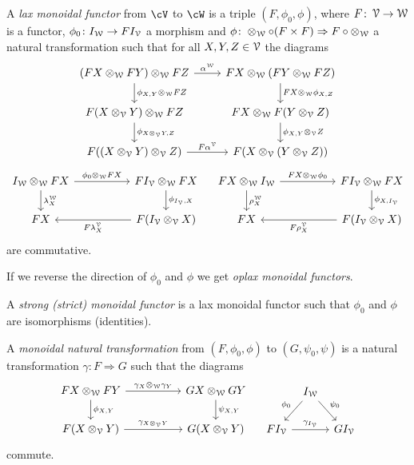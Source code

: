 \documentclass[a4paper,11pt,oneside,openany]{scrbook}
\begin{document}
\begin{defn}
	A \emph{lax monoidal functor} from $\cV$ to $\cW$ is a triple $(F,\phi_0,\phi)$, where $F\colon\operatorname{\mathcal{V}}\rightarrow\operatorname{\mathcal{W}}$ is a functor, $\phi_0\colon I_{\operatorname{\mathcal{W}}}\rightarrow FI_{\operatorname{\mathcal{V}}}$ a morphism and $\phi\colon\otimes_{\operatorname{\mathcal{W}}}\circ(F\times F)\Rightarrow F\circ\otimes_{\operatorname{\mathcal{W}}}$ a natural transformation such that for all $X,Y,Z\in\operatorname{\mathcal{V}}$ the diagrams
	\[
		\begin{tikzcd}
			(FX\otimes_{\W}FY)\otimes_{\W}FZ\ar[r, "\alpha^{\W}"]\ar[d, "\phi_{X,Y}\otimes_{\W}FZ"]
			& FX\otimes_{\W}(FY\otimes_{\W}FZ)\ar[d, "FX\otimes_{\W}\phi_{X,Z}"] \\
			F(X\otimes_{\V}Y)\otimes_{\W}FZ\ar[d, "\phi_{X\otimes_{\V}Y,Z}"]
			& FX\otimes_{\W}F(Y\otimes_{\V}Z)\ar[d, "\phi_{X,Y}\otimes_{\V}Z"] \\
			F((X\otimes_{\V}Y)\otimes_{\V}Z)\ar[r, "F\alpha^{\V}"]
			& F(X\otimes_{\V}(Y\otimes_{\V}Z))
		\end{tikzcd}
	\]
	\[
		\begin{tikzcd}[column sep=5.0em]
			I_{\W}\otimes_{\W}FX\ar[r, "\phi_0\otimes_{\W}FX"]\ar[d, "\lambda_X^{\W}"]
			& FI_{\V}\otimes_{\W}FX\ar[d, "\phi_{I_{\V},X}"] \\
			FX
			& F(I_{\V}\otimes_{\V}X)\ar[l, "F\lambda_X^{\V}"]
		\end{tikzcd}
		\quad
		\begin{tikzcd}[column sep=5.0em]
			FX\otimes_{\W}I_{\W}\ar[r, "FX\otimes_{\W}\phi_0"]\ar[d, "\rho_X^{\W}"]
			& FI_{\V}\otimes_{\W}FX\ar[d, "\phi_{X,I_{\V}}"] \\
			FX
			& F(I_{\V}\otimes_{\V}X)\ar[l, "F\rho_X^{\V}"]
		\end{tikzcd}
	\]
	are commutative.

	If we reverse the direction of $\phi_0$ and $\phi$ we get \emph{oplax monoidal functors}.

	A \emph{strong (strict) monoidal functor} is a lax monoidal functor such that $\phi_0$ and $\phi$ are isomorphisms (identities).

	A \emph{monoidal natural transformation} from $(F,\phi_0,\phi)$ to $(G,\psi_0,\psi)$ is a natural transformation $\gamma\colon F\Rightarrow G$ such that the diagrams
	\[
		\begin{tikzcd}[column sep=5.0em]
			FX\otimes_{\W}FY\ar[r, "\gamma_X\otimes_{\W}\gamma_Y"]\ar[d, "\phi_{X,Y}"]
			& GX\otimes_{\W}GY\ar[d, "\psi_{X,Y}"] \\
			F(X\otimes_{\V}Y)\ar[r, "\gamma_{X\otimes_{\V}Y}"]
			& G(X\otimes_{\V}Y)
		\end{tikzcd}
		\quad
		\begin{tikzcd}[column sep=tiny]
			& I_{\W}\ar[dl, "\phi_0", swap]\ar[dr, "\psi_0"] \\
			FI_{\V}\ar[rr, "\gamma_{I_{\V}}"]
			&& GI_{\V}
		\end{tikzcd}
	\]
	commute.
\end{defn}
\end{document}
